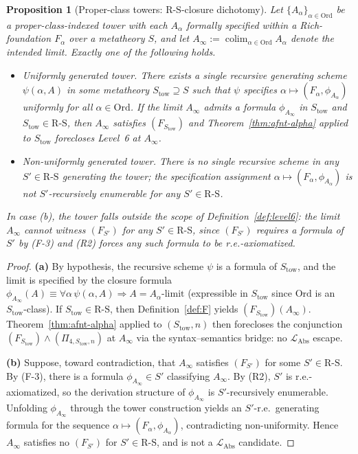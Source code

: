 \documentclass[11pt]{article}
\theoremstyle{plain}
\newtheorem{proposition}[theorem]{Proposition}
\theoremstyle{definition}
\newcommand{\RS}{\mathrm{R\text{-}S}}
\newcommand{\LAbs}{\mathcal{L}_{\mathrm{Abs}}}
\DeclareMathOperator{\colim}{colim}
\begin{document}
\begin{proposition}[Proper-class towers: $\RS$-closure dichotomy]\label{prop:proper-class}
Let $\{A_\alpha\}_{\alpha \in \mathrm{Ord}}$ be a proper-class-indexed tower with each $A_\alpha$ formally specified within a Rich-foundation $F_\alpha$ over a metatheory $S$, and let $A_\infty := \colim_{\alpha \in \mathrm{Ord}} A_\alpha$ denote the intended limit. Exactly one of the following holds.
\begin{itemize}
\item[\textbf{(a)}] \emph{Uniformly generated tower.} There exists a single recursive generating scheme $\psi(\alpha, A)$ in some metatheory $S_{\mathrm{tow}} \supseteq S$ such that $\psi$ specifies $\alpha \mapsto (F_\alpha, \phi_{A_\alpha})$ uniformly for all $\alpha \in \mathrm{Ord}$. If the limit $A_\infty$ admits a formula $\phi_{A_\infty}$ in $S_{\mathrm{tow}}$ and $S_{\mathrm{tow}} \in \RS$, then $A_\infty$ satisfies $(F_{S_{\mathrm{tow}}})$ and Theorem~\ref{thm:afnt-alpha} applied to $S_{\mathrm{tow}}$ forecloses Level~6 at $A_\infty$.
\item[\textbf{(b)}] \emph{Non-uniformly generated tower.} There is no single recursive scheme in any $S' \in \RS$ generating the tower; the specification assignment $\alpha \mapsto (F_\alpha, \phi_{A_\alpha})$ is not $S'$-recursively enumerable for any $S' \in \RS$.
\end{itemize}
In case (b), the tower falls outside the scope of Definition~\ref{def:level6}: the limit $A_\infty$ cannot witness $(F_{S'})$ for any $S' \in \RS$, since $(F_{S'})$ requires a formula of $S'$ by (F-3) and (R2) forces any such formula to be r.e.-axiomatized.
\end{proposition}

\begin{proof}
\textbf{(a)} By hypothesis, the recursive scheme $\psi$ is a formula of $S_{\mathrm{tow}}$, and the limit is specified by the closure formula $\phi_{A_\infty}(A) \equiv \forall \alpha\,\psi(\alpha, A) \Rightarrow A = A_\alpha\text{-limit}$ (expressible in $S_{\mathrm{tow}}$ since $\mathrm{Ord}$ is an $S_{\mathrm{tow}}$-class). If $S_{\mathrm{tow}} \in \RS$, then Definition~\ref{def:F} yields $(F_{S_{\mathrm{tow}}})(A_\infty)$. Theorem~\ref{thm:afnt-alpha} applied to $(S_{\mathrm{tow}}, n)$ then forecloses the conjunction $(F_{S_{\mathrm{tow}}}) \wedge (\Pi_{4, S_{\mathrm{tow}}, n})$ at $A_\infty$ via the syntax--semantics bridge: no $\LAbs$ escape.

\textbf{(b)} Suppose, toward contradiction, that $A_\infty$ satisfies $(F_{S'})$ for some $S' \in \RS$. By (F-3), there is a formula $\phi_{A_\infty} \in S'$ classifying $A_\infty$. By (R2), $S'$ is r.e.-axiomatized, so the derivation structure of $\phi_{A_\infty}$ is $S'$-recursively enumerable. Unfolding $\phi_{A_\infty}$ through the tower construction yields an $S'$-r.e.\ generating formula for the sequence $\alpha \mapsto (F_\alpha, \phi_{A_\alpha})$, contradicting non-uniformity. Hence $A_\infty$ satisfies no $(F_{S'})$ for $S' \in \RS$, and is not a $\LAbs$ candidate.
\end{proof}
\end{document}
